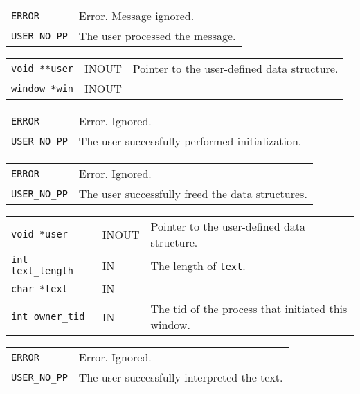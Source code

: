 \documentclass[twoside,11pt]{article}
\begin{document}
{\newpage
\clearpage
\samepage \begin{tabular}{lp{300pt}}
{\tt ERROR} & Error. Message ignored. \\ 
{\tt USER\_NO\_PP} & The user processed the message. \\ 
\end{tabular}
}

{\newpage
\clearpage
\samepage \begin{tabular}{llp{275pt}}
{\tt void **user} & INOUT & Pointer to the user-defined data structure. \\ 
{\tt window *win} & INOUT & \\ 
\end{tabular}
}

{\newpage
\clearpage
\samepage \begin{tabular}{lp{300pt}}
{\tt ERROR} & Error. Ignored. \\ 
{\tt USER\_NO\_PP} & The user successfully performed initialization. \\ 
\end{tabular}
}

{\newpage
\clearpage
\samepage \begin{tabular}{lp{300pt}}
{\tt ERROR} & Error. Ignored. \\ 
{\tt USER\_NO\_PP} & The user successfully freed the data structures. \\ 
\end{tabular}
}

{\newpage
\clearpage
\samepage \begin{tabular}{llp{250pt}}
{\tt void *user} & INOUT & Pointer to the user-defined data structure. \\ 
{\tt int text\_length} & IN & The length of {\tt text}. \\ 
{\tt char *text} & IN &  \\ 
{\tt int owner\_tid} & IN & The tid of the process that initiated this window.
\\  
\end{tabular}
}

{\newpage
\clearpage
\samepage \begin{tabular}{lp{300pt}}
{\tt ERROR} & Error. Ignored. \\ 
{\tt USER\_NO\_PP} & The user successfully interpreted the text. \\ 
\end{tabular}
}

\end{document}
